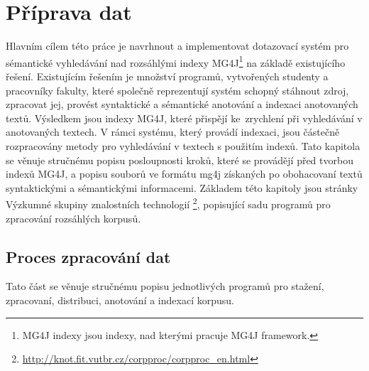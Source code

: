 \chapter{Příprava dat }
\label{chapter3}
Hlavním cílem této práce je navrhnout a implementovat dotazovací systém pro sémantické vyhledávání nad rozsáhlými indexy MG4J\footnote{MG4J indexy jsou indexy, nad kterými pracuje MG4J framework.} na základě existujícího řešení.  Existujícím řešením je množství programů, vytvořených studenty a pracovníky fakulty, které společně reprezentují systém schopný stáhnout zdroj, zpracovat jej, provést syntaktické a sémantické anotování a indexaci anotovaných textů. Výsledkem jsou indexy MG4J, které přispějí ke~zrychlení při vyhledávání v anotovaných textech.  V rámci systému, který provádí indexaci, jsou částečně rozpracovány metody pro vyhledávání v textech s použitím indexů. Tato kapitola se věnuje stručnému popisu posloupnosti kroků, které se provádějí před tvorbou indexů MG4J, a popisu souborů ve formátu mg4j získaných po obohacovaní textů  syntaktickými a sémantickými informacemi. Základem této kapitoly jsou stránky Výzkumné skupiny znalostních technologií  \footnote{\href{http://knot.fit.vutbr.cz/corpproc/corpproc_en.html}{http://knot.fit.vutbr.cz/corpproc/corpproc\_en.html}}, popisující sadu programů pro zpracování rozsáhlých korpusů.

\section{Proces zpracování dat}

Tato část se věnuje stručnému popisu jednotlivých programů pro stažení, zpracovaní, distribuci, anotování a indexací korpusu.

\label{DataProcessingLbl}
